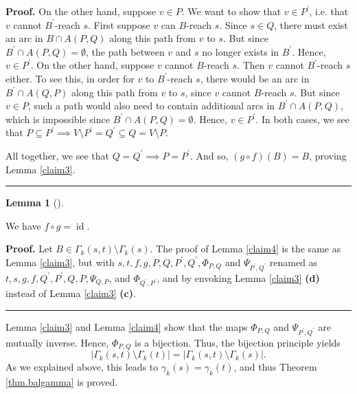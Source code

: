 \documentclass[numbers=enddot,12pt,final,onecolumn,notitlepage]{scrartcl}%
\theoremstyle{definition}
\newtheorem{lem}[theo]{Lemma}
\newenvironment{lemma}[1][]
{\begin{lem}[#1]\begin{leftbar}}
{\end{leftbar}\end{lem}}
\newenvironment{proof}[1][Proof]{\noindent\textbf{#1.} }{\ \rule{0.5em}{0.5em}}
\theoremstyle{plainsl}
\begin{document}
\begin{proof}
On the other hand, suppose $v \in P$. We want to show that $v \in P^{\prime}$,
i.e. that $v$ cannot $B^{\prime}$-reach $s$. First suppose $v$ can $B$-reach
$s$. Since $s \in Q$, there must exist an arc in $B \cap A(P,Q)$ along this
path from $v$ to $s$. But since $B^{\prime}\cap A(P,Q) = \emptyset$, the path
between $v$ and $s$ no longer exists in $B^{\prime}$. Hence, $v \in P^{\prime
}$. On the other hand, suppose $v$ cannot $B$-reach $s$. Then $v$ cannot
$B^{\prime}$-reach $s$ either. To see this, in order for $v$ to $B^{\prime}%
$-reach $s$, there would be an arc in $B^{\prime}\cap A(Q,P)$ along this path
from $v$ to $s$, since $v$ cannot $B$-reach $s$. But since $v \in P$, such a
path would also need to contain additional arcs in $B^{\prime}\cap A(P,Q)$,
which is impossible since $B^{\prime}\cap A(P,Q) = \emptyset$. Hence, $v \in
P^{\prime}$. In both cases, we see that $P \subseteq P^{\prime}\implies V
\setminus P^{\prime}= Q^{\prime}\subseteq Q = V \setminus P$.

All together, we see that $Q = Q^{\prime}\implies P = P^{\prime}$. And so, $(g
\circ f)(B) = B$, proving Lemma \ref{claim3}.
\end{proof}

\begin{lemma}
We have $f\circ g=\operatorname*{id}$.
\end{lemma}

\begin{proof}
\label{claim4} Let $B \in\Gamma_{k}(s,t) \setminus\Gamma_{k}(s)$. The proof of
Lemma \ref{claim4} is the same as Lemma \ref{claim3}, but with
$s,t,f,g,P,Q,P^{\prime},Q^{\prime},\Phi_{P,Q}$ and $\Psi_{P^{\prime}%
,Q^{\prime}}$ renamed as $t,s,g,f,Q^{\prime},P^{\prime},Q,P,\Psi_{Q,P}$, and
$\Phi_{Q^{\prime},P^{\prime}}$, and by envoking Lemma \ref{claim3}
\textbf{(d)} instead of Lemma \ref{claim3} \textbf{(c)}.
\end{proof}

Lemma \ref{claim3} and Lemma \ref{claim4} show that the maps $\Phi_{P,Q}$ and
$\Psi_{P^{\prime},Q^{\prime}}$ are mutually inverse. Hence, $\Phi_{P,Q}$ is a
bijection. Thus, the bijection principle yields%
\[
\left\vert \Gamma_{k}\left(  s,t\right)  \setminus\Gamma_{k}\left(  t\right)
\right\vert =\left\vert \Gamma_{k}\left(  s,t\right)  \setminus\Gamma
_{k}\left(  s\right)  \right\vert .
\]
As we explained above, this leads to $\gamma_{k}\left(  s\right)  =\gamma
_{k}\left(  t\right)  $, and thus Theorem \ref{thm.balgamma} is proved.
\end{document}
